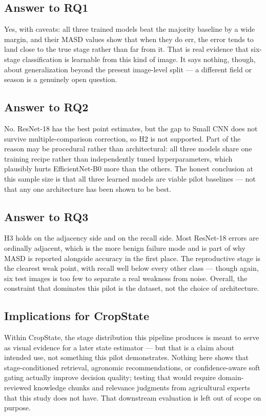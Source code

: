 \documentclass{llncs}
\begin{document}
\subsection{Answer to RQ1}

Yes, with caveats: all three trained models beat the majority baseline by a wide margin, and their MASD values show that when they do err, the error tends to land close to the true stage rather than far from it. That is real evidence that six-stage classification is learnable from this kind of image. It says nothing, though, about generalization beyond the present image-level split — a different field or season is a genuinely open question.

\subsection{Answer to RQ2}

No. ResNet-18 has the best point estimates, but the gap to Small CNN does not survive multiple-comparison correction, so H2 is not supported. Part of the reason may be procedural rather than architectural: all three models share one training recipe rather than independently tuned hyperparameters, which plausibly hurts EfficientNet-B0 more than the others. The honest conclusion at this sample size is that all three learned models are viable pilot baselines — not that any one architecture has been shown to be best.

\subsection{Answer to RQ3}

H3 holds on the adjacency side and on the recall side. Most ResNet-18 errors are ordinally adjacent, which is the more benign failure mode and is part of why MASD is reported alongside accuracy in the first place. The reproductive stage is the clearest weak point, with recall well below every other class — though again, six test images is too few to separate a real weakness from noise. Overall, the constraint that dominates this pilot is the dataset, not the choice of architecture.

\subsection{Implications for CropState}

Within CropState, the stage distribution this pipeline produces is meant to serve as visual evidence for a later state estimator — but that is a claim about intended use, not something this pilot demonstrates. Nothing here shows that stage-conditioned retrieval, agronomic recommendations, or confidence-aware soft gating actually improve decision quality; testing that would require domain-reviewed knowledge chunks and relevance judgments from agricultural experts that this study does not have. That downstream evaluation is left out of scope on purpose.
\end{document}

